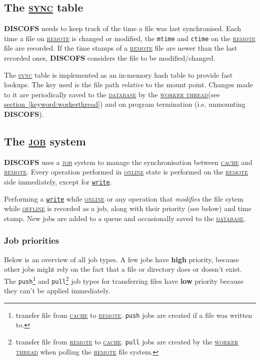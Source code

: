 \documentclass[a4paper]{article}
\newcommand{\software}[1]{\textsc{\textbf{#1}}\xspace}
\newcommand{\discofs}{\software{DISCOFS}}
\newcommand{\keyword}[1]{\hyperref[keyword:#1]{\textsc{#1}}\xspace}
\newcommand{\job}{\keyword{job}}
\newcommand{\jobtype}[1]{\texttt{#1}\xspace}
\newcommand{\push}{\jobtype{push}}
\newcommand{\pull}{\jobtype{pull}}
\newcommand{\sync}{\keyword{sync}}
\newcommand{\cache}{\keyword{cache}}
\newcommand{\remote}{\keyword{remote}}
\newcommand{\database}{\keyword{database}}
\newcommand{\online}{\keyword{online}}
\newcommand{\offline}{\keyword{offline}}
\newcommand{\workerthread}{\hyperref[keyword:workerthread]{\textsc{worker thread}}\xspace}
\newcommand{\fsopref}[1]{\hyperref[fsop:#1]{\texttt{#1}}}
\newcommand{\sectionref}[1]{\hyperref[#1]{section~\ref{#1}}}
\begin{document}
\subsection{The \sync table} %
\label{keyword:sync}
\discofs needs to keep track of the time a file was last synchronised. Each time
a file on \remote is changed or modified, the \texttt{mtime} and \texttt{ctime} on
the \remote file are recorded. If the time stamps of a \remote file are newer than
the last recorded ones, \discofs considers the file to be modified/changed.

The \sync table is implemented as an in-memory hash table to provide fast
lookups. The key used is the file path \emph{relative} to the mount point.
Changes made to it are periodically saved to the \database by the
\workerthread (see \sectionref{keyword:workerthread}) and on program termination
(i.e. unmounting \discofs).

\subsection{The \job system} %
\label{keyword:job}
\discofs uses a \job system to manage the synchronisation between \cache and
\remote.
Every operation performed in \online state is performed on the
\remote side immediately, except for \fsopref{write}.

Performing a \fsopref{write} while \online or any operation that
\emph{modifies} the file sytem while \offline is recorded as a job, along with
their priority (see below) and time stamp. New jobs are added to a queue and
occasionally saved to the \database.

\subsubsection{Job priorities}
Below is an overview of all job types. A few jobs have \textbf{high}
priority, because other jobs might rely on the fact that a file or directory
does or doesn't exist. The
\texttt{push}\footnote{transfer file from \cache to \remote. \push jobs are created if a
	file was written to.}
and
\texttt{pull}\footnote{transfer file from \remote to \cache. \pull jobs are created by
	the \workerthread when polling the \remote file system.}
job types for transferring files have \textbf{low} priority because they can't be applied
immediately.
\end{document}
